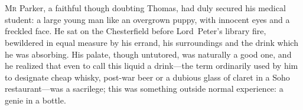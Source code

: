 \chapter[Chapter \thechapter]{}
\lettrine{M}{r} Parker, a faithful though doubting Thomas, had duly secured his medical student: a large young man like an overgrown puppy, with innocent eyes and a freckled face. He sat on the Chesterfield before Lord~Peter's library fire, bewildered in equal measure by his errand, his surroundings and the drink which he was absorbing. His palate, though untutored, was naturally a good one, and he realized that even to call this liquid a drink—the term ordinarily used by him to designate cheap whisky, post-war beer or a dubious glass of claret in a Soho restaurant—was a sacrilege; this was something outside normal experience: a genie in a bottle.

